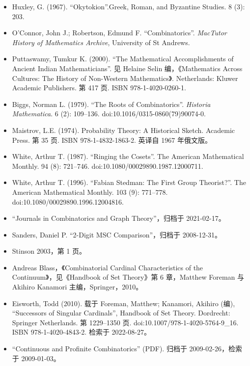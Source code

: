 \begin{itemize}
  \item Huxley, G. (1967). “Okytokion”.Greek, Roman, and Byzantine Studies. 8 (3): 203.  
  \item O'Connor, John J.; Robertson, Edmund F. “Combinatorics”. \textit{MacTutor History of Mathematics Archive}, University of St Andrews.  
  \item Puttaswamy, Tumkur K. (2000). “The Mathematical Accomplishments of Ancient Indian Mathematicians”. 见 Helaine Selin 编，《Mathematics Across Cultures: The History of Non-Western Mathematics》. Netherlands: Kluwer Academic Publishers. 第 417 页. ISBN 978-1-4020-0260-1.  
  \item Biggs, Norman L. (1979). “The Roots of Combinatorics”. \textit{Historia Mathematica}. 6 (2): 109–136. doi:10.1016/0315-0860(79)90074-0.  
  \item Maistrov, L.E. (1974). Probability Theory: A Historical Sketch. Academic Press. 第 35 页. ISBN 978-1-4832-1863-2. 英译自 1967 年俄文版。  
  \item White, Arthur T. (1987). “Ringing the Cosets”. The American Mathematical Monthly. 94 (8): 721–746. doi:10.1080/00029890.1987.12000711.  
  \item White, Arthur T. (1996). “Fabian Stedman: The First Group Theorist?”. The American Mathematical Monthly. 103 (9): 771–778. doi:10.1080/00029890.1996.12004816.  
  \item “Journals in Combinatorics and Graph Theory”，归档于 2021-02-17。  
  \item Sanders, Daniel P. “2-Digit MSC Comparison”，归档于 2008-12-31。  
  \item Stinson 2003，第 1 页。  
  \item Andreas Blass，《Combinatorial Cardinal Characteristics of the Continuum》，见《Handbook of Set Theory》第 6 章，Matthew Foreman 与 Akihiro Kanamori 主编，Springer，2010。  
  \item Eisworth, Todd (2010). 载于 Foreman, Matthew; Kanamori, Akihiro (编), “Successors of Singular Cardinals”, Handbook of Set Theory. Dordrecht: Springer Netherlands. 第 1229–1350 页. doi:10.1007/978-1-4020-5764-9\_16. ISBN 978-1-4020-4843-2. 检索于 2022-08-27。  
  \item “Continuous and Profinite Combinatorics” (PDF). 归档于 2009-02-26，检索于 2009-01-03。  
\end{itemize}





